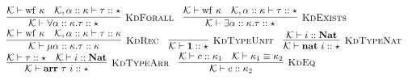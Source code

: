 \documentclass[fleqn]{article}
\begin{document}
\[\begin{array}{l}
    \infer[\textsc{KdForall}]{\mathcal{K} \vdash \forall \alpha :: \kappa. \tau :: \star}{\mathcal{K} \vdash \mathrm{wf}~\kappa & \mathcal{K},\alpha :: \kappa \vdash \tau :: \star} \hspace{1em}
    \infer[\textsc{KdExists}]{\mathcal{K} \vdash \exists \alpha :: \kappa. \tau :: \star}{\mathcal{K} \vdash \mathrm{wf}~\kappa & \mathcal{K},\alpha :: \kappa \vdash \tau :: \star} \\
    \infer[\textsc{KdRec}]{\mathcal{K} \vdash \mu \alpha :: \kappa. \tau :: \kappa}{\mathcal{K} \vdash \mathrm{wf}~\kappa & \mathcal{K},\alpha :: \kappa \vdash \tau :: \kappa} \hspace{1em}
    \infer[\textsc{KdTypeUnit}]{\mathcal{K} \vdash \mathbf{1} :: \star}{} \hspace{1em}
    \infer[\textsc{KdTypeNat}]{\mathcal{K} \vdash \mathbf{nat}~i :: \star}{\mathcal{K} \vdash i :: \mathbf{Nat}} \\
    \infer[\textsc{KdTypeArr}]{\mathcal{K} \vdash \mathbf{arr}~\tau~i :: \star}{\mathcal{K} \vdash \tau :: \star & \mathcal{K} \vdash i :: \mathbf{Nat}} \hspace{1em}
    \infer[\textsc{KdEq}]{\mathcal{K} \vdash c :: \kappa_2}{\mathcal{K} \vdash c :: \kappa_1 & \mathcal{K} \vdash \kappa_1 \equiv \kappa_2}
\end{array}
\]
\end{document}
